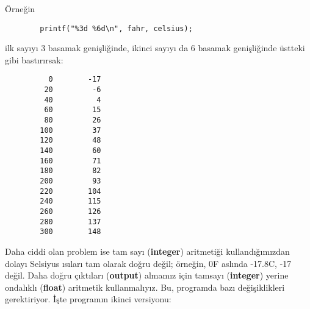 \documentclass[a4paper,12pt,oneside]{book}
\begin{document}
Örneğin
\begin{lstlisting}
        printf("%3d %6d\n", fahr, celsius);
\end{lstlisting}
ilk sayıyı 3 basamak genişliğinde, ikinci sayıyı da 6 basamak genişliğinde üstteki gibi bastırırsak:
\begin{lstlisting}
          0        -17
         20         -6
         40          4
         60         15
         80         26
        100         37
        120         48
        140         60
        160         71
        180         82
        200         93
        220        104
        240        115
        260        126
        280        137
        300        148
\end{lstlisting}
\par Daha ciddi olan problem ise tam sayı (\textbf{integer}) aritmetiği kullandığımızdan dolayı Selsiyus ısıları tam olarak doğru değil; örneğin, 0\degree F aslında -17.8\degree C, -17 değil. Daha doğru çıktıları (\textbf{output}) almamız için tamsayı (\textbf{integer}) yerine ondalıklı (\textbf{float}) aritmetik kullanmalıyız. Bu, programda bazı değişiklikleri gerektiriyor. İşte programın ikinci versiyonu: \pagebreak
\end{document}
